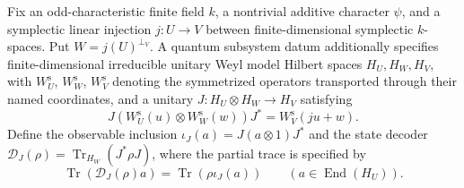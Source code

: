 \begin{definition}
Fix an odd-characteristic finite field $k$, a nontrivial additive character
$\psi$, and a symplectic linear injection $j:U\to V$ between
finite-dimensional symplectic $k$-spaces. Put $W=j(U)^{\perp_V}$.
A quantum subsystem datum additionally specifies finite-dimensional
irreducible unitary Weyl model Hilbert spaces $H_U,H_W,H_V$, with $W^{\mathrm s}_U$,
$W^{\mathrm s}_W$, $W^{\mathrm s}_V$ denoting the symmetrized operators
transported through their named coordinates, and a unitary
$J:H_U\otimes H_W\to H_V$ satisfying
\[
 J(W^{\mathrm s}_U(u)\otimes W^{\mathrm s}_W(w))J^*
 =W^{\mathrm s}_V(ju+w).
\]
Define the observable inclusion $\iota_J(a)=J(a\otimes1)J^*$ and the state
decoder $\mathcal D_J(\rho)=\operatorname{Tr}_{H_W}(J^*\rho J)$, where the
partial trace is specified by
\[
 \operatorname{Tr}(\mathcal D_J(\rho)a)
 =\operatorname{Tr}(\rho\iota_J(a))
 \qquad(a\in\operatorname{End}(H_U)).
\]


\end{definition}
